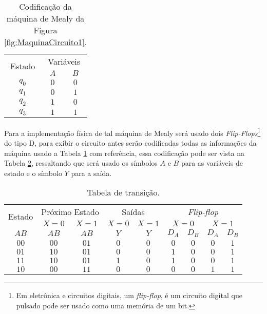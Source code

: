 \begin{example}
	\begin{table}[h]
		\centering
		\begin{tabular}{c|cc}
			\hline
			\multirow{2}{*}{Estado} & \multicolumn{2}{c}{Variáveis}\\
			& $A$ & $B$\\ \hline
			$q_0$ & $0$ & $0$\\
			$q_1$ & $0$ & $1$\\
			$q_2$ & $1$ & $0$\\
			$q_3$ & $1$ & $1$\\
		\end{tabular}
		\caption{Codificação da máquina de Mealy da Figura \ref{fig:MaquinaCircuito1}.}
		\label{tab:MaquinaCircuito1}
	\end{table}

	Para a implementação física de tal máquina de Mealy será usado dois \textit{Flip-Flops}\footnote{Em eletrônica e circuitos digitais, um \textit{flip-flop}, é um circuito digital que pulsado pode ser usado como uma memória de um bit.} do tipo D, para exibir o circuito antes serão codificadas todas as informações da máquina usado a Tabela \ref{tab:MaquinaCircuito1} com referência, essa codificação pode ser vista na Tabela \ref{tab:Circuito1}, ressaltando que será usado os símbolos $A$ e $B$ para as variáveis de estado e o símbolo $Y$ para a saída.
	
	\begin{table}[h]
		\centering
		\begin{tabular}{c|cc|cc|c|c|c|c}
			\hline
			\multirow{2}{*}{Estado} & \multicolumn{2}{c|}{Próximo Estado} & \multicolumn{2}{c|}{Saídas} &  \multicolumn{4}{c}{\textit{ Flip-flop}}\\
			 & $X = 0$ & $X = 1$ &  $X = 0$ & $X = 1$ &\multicolumn{2}{c}{$X = 0$}  &  \multicolumn{2}{c}{$X = 1$}\\
			 \hline
			 $AB$ & $AB$ & $AB$ & $Y$  & $Y$ & $D_A$ & $D_B$ & $D_A$ & $D_B$\\
			 \hline
			 $00$ & $00$ & $01$  & $0$ & $0$ & $0$ & $0$ & $0$ & $1$\\
			 $01$ & $10$ &  $01$ & $0$ & $0$ & $1$ & $0$ & $0$ & $1$\\
			 $11$ & $10$ & $01$ & $1$ & $0$ & $1$ & $0$ &  $0$ & $1$\\
			 $10$ & $00$ & $11$ & $0$ & $0$ & $0$ & $0$ & $1$ & $1$\\
			 \hline
		\end{tabular}
		\caption{Tabela de transição.}
		\label{tab:Circuito1}
	\end{table}


\end{example}

